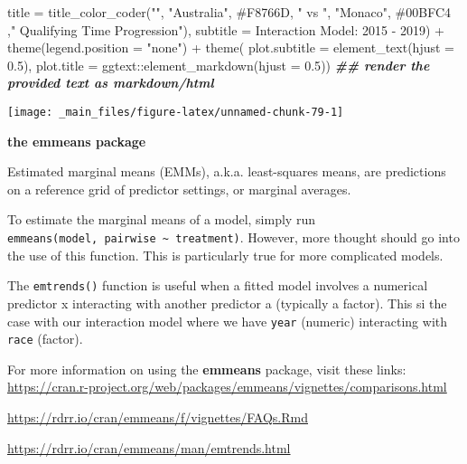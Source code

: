\documentclass[
]{book}
\newenvironment{Shaded}{\begin{snugshade}}{\end{snugshade}}
\newcommand{\AttributeTok}[1]{\textcolor[rgb]{0.77,0.63,0.00}{#1}}
\newcommand{\DocumentationTok}[1]{\textcolor[rgb]{0.56,0.35,0.01}{\textbf{\textit{#1}}}}
\newcommand{\FloatTok}[1]{\textcolor[rgb]{0.00,0.00,0.81}{#1}}
\newcommand{\FunctionTok}[1]{\textcolor[rgb]{0.00,0.00,0.00}{#1}}
\newcommand{\NormalTok}[1]{#1}
\newcommand{\SpecialCharTok}[1]{\textcolor[rgb]{0.00,0.00,0.00}{#1}}
\newcommand{\StringTok}[1]{\textcolor[rgb]{0.31,0.60,0.02}{#1}}
\begin{document}
\begin{Shaded}
\begin{Highlighting}[]
       \AttributeTok{title =} \FunctionTok{title\_color\_coder}\NormalTok{(}\StringTok{""}\NormalTok{, }\StringTok{"Australia"}\NormalTok{, }\StringTok{\textquotesingle{}\#F8766D\textquotesingle{}}\NormalTok{, }\StringTok{" vs "}\NormalTok{, }\StringTok{"Monaco"}\NormalTok{, }\StringTok{\textquotesingle{}\#00BFC4\textquotesingle{}}\NormalTok{ ,}\StringTok{" Qualifying Time Progression"}\NormalTok{), }
       \AttributeTok{subtitle =} \StringTok{\textquotesingle{}Interaction Model: 2015 {-} 2019\textquotesingle{}}\NormalTok{) }\SpecialCharTok{+} 
  \FunctionTok{theme}\NormalTok{(}\AttributeTok{legend.position =} \StringTok{"none"}\NormalTok{) }\SpecialCharTok{+}
  \FunctionTok{theme}\NormalTok{( }\AttributeTok{plot.subtitle =} \FunctionTok{element\_text}\NormalTok{(}\AttributeTok{hjust =} \FloatTok{0.5}\NormalTok{),}
        \AttributeTok{plot.title =}\NormalTok{ ggtext}\SpecialCharTok{::}\FunctionTok{element\_markdown}\NormalTok{(}\AttributeTok{hjust =} \FloatTok{0.5}\NormalTok{)) }\DocumentationTok{\#\# render the provided text as markdown/html}
\end{Highlighting}
\end{Shaded}

\begin{center}\texttt{[image: \_main\_files/figure-latex/unnamed-chunk-79-1]} \end{center}

\begin{blackbox}

\begin{center}
\textbf{the emmeans package}

\end{center}

Estimated marginal means (EMMs), a.k.a. least-squares means, are predictions on a reference grid of predictor settings, or marginal averages.

To estimate the marginal means of a model, simply run \texttt{emmeans(model,\ pairwise\ \textasciitilde{}\ treatment)}. However, more thought should go into the use of this function. This is particularly true for more complicated models.

The \texttt{emtrends()} function is useful when a fitted model involves a numerical predictor x interacting with another predictor a (typically a factor). This si the case with our interaction model where we have \texttt{year} (numeric) interacting with \texttt{race} (factor).

For more information on using the \textbf{emmeans} package, visit these links: \url{https://cran.r-project.org/web/packages/emmeans/vignettes/comparisons.html}

\url{https://rdrr.io/cran/emmeans/f/vignettes/FAQs.Rmd}

\url{https://rdrr.io/cran/emmeans/man/emtrends.html}

\end{blackbox}
\end{document}
